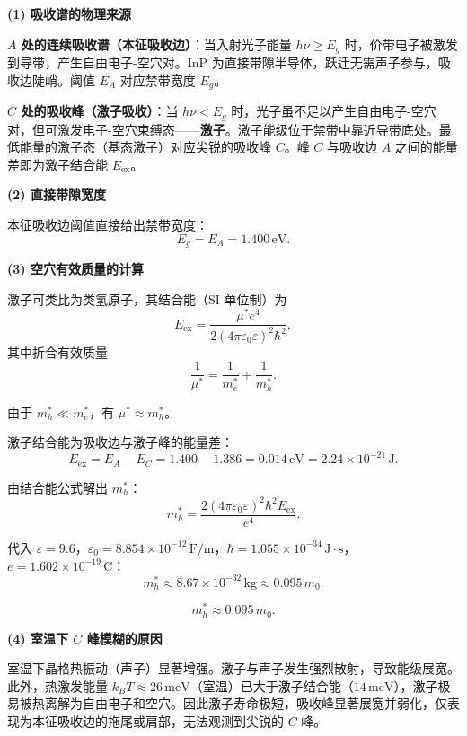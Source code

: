 \begin{derivationbox}[标准解题过程]
\textbf{(1) 吸收谱的物理来源}

\textbf{$A$ 处的连续吸收谱（本征吸收边）}：当入射光子能量 $h\nu\ge E_g$ 时，价带电子被激发到导带，产生自由电子-空穴对。InP 为直接带隙半导体，跃迁无需声子参与，吸收边陡峭。阈值 $E_A$ 对应禁带宽度 $E_g$。

\textbf{$C$ 处的吸收峰（激子吸收）}：当 $h\nu<E_g$ 时，光子虽不足以产生自由电子-空穴对，但可激发电子-空穴束缚态——\textbf{激子}。激子能级位于禁带中靠近导带底处。最低能量的激子态（基态激子）对应尖锐的吸收峰 $C$。峰 $C$ 与吸收边 $A$ 之间的能量差即为激子结合能 $E_{\text{ex}}$。

\textbf{(2) 直接带隙宽度}

本征吸收边阈值直接给出禁带宽度：
\begin{equation}
\boxed{E_g=E_A=1.400\,\text{eV}.}
\end{equation}

\textbf{(3) 空穴有效质量的计算}

激子可类比为类氢原子，其结合能（SI 单位制）为
\begin{equation}
E_{\text{ex}}=\frac{\mu^*e^4}{2(4\pi\varepsilon_0\varepsilon)^2\hbar^2},
\end{equation}
其中折合有效质量
\begin{equation}
\frac{1}{\mu^*}=\frac{1}{m_e^*}+\frac{1}{m_h^*}.
\end{equation}

由于 $m_h^*\ll m_e^*$，有 $\mu^*\approx m_h^*$。

激子结合能为吸收边与激子峰的能量差：
\begin{equation}
E_{\text{ex}}=E_A-E_C=1.400-1.386=0.014\,\text{eV}=2.24\times10^{-21}\,\text{J}.
\end{equation}

由结合能公式解出 $m_h^*$：
\begin{equation}
m_h^*=\frac{2(4\pi\varepsilon_0\varepsilon)^2\hbar^2E_{\text{ex}}}{e^4}.
\end{equation}

代入 $\varepsilon=9.6$，$\varepsilon_0=8.854\times10^{-12}\,\text{F/m}$，$\hbar=1.055\times10^{-34}\,\text{J}\cdot\text{s}$，$e=1.602\times10^{-19}\,\text{C}$：
\begin{equation}
m_h^*\approx8.67\times10^{-32}\,\text{kg}\approx0.095\,m_0.
\end{equation}

\begin{equation}
\boxed{m_h^*\approx0.095\,m_0.}
\end{equation}

\textbf{(4) 室温下 $C$ 峰模糊的原因}

室温下晶格热振动（声子）显著增强。激子与声子发生强烈散射，导致能级展宽。此外，热激发能量 $k_BT\approx26\,\text{meV}$（室温）已大于激子结合能（$14\,\text{meV}$），激子极易被热离解为自由电子和空穴。因此激子寿命极短，吸收峰显著展宽并弱化，仅表现为本征吸收边的拖尾或肩部，无法观测到尖锐的 $C$ 峰。
\end{derivationbox}

